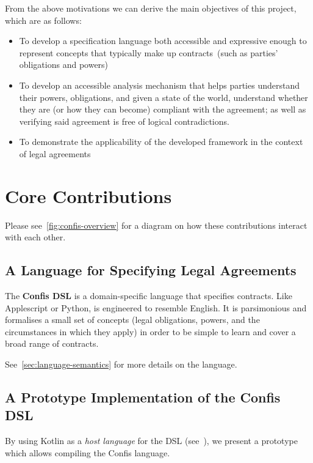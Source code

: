 From the above motivations we can derive the main objectives of this project, which are as follows:
\begin{itemize}
    \item To develop a specification language both accessible and expressive enough to represent concepts that typically make up contracts~(such as parties' obligations and powers)

    \item To develop an accessible analysis mechanism that helps parties understand their powers, obligations, and given a state of the world, understand whether they are (or how they can become) compliant with the agreement;
    as well as verifying said agreement is free of logical contradictions.

    \item To demonstrate the applicability of the developed framework in the context of legal agreements
\end{itemize}


\section{Core Contributions}\label{sec:core-contributions}

Please see~\autoref{fig:confis-overview} for a diagram on how these contributions interact with each other.

\subsection{A Language for Specifying Legal Agreements}
The \textbf{Confis DSL} is a domain-specific language that specifies contracts.
Like Applescript or Python, is engineered to resemble English.
It is parsimonious and formalises a small set of concepts (legal obligations, powers, and the circumstances in which they apply) in order to be simple to learn and cover a broad range of contracts.

See~\autoref{sec:language-semantics} for more details on the language.

\subsection{A Prototype Implementation of the Confis DSL}
By using Kotlin as a \emph{host language} for the DSL (see~), we present a prototype which allows compiling the Confis language.

